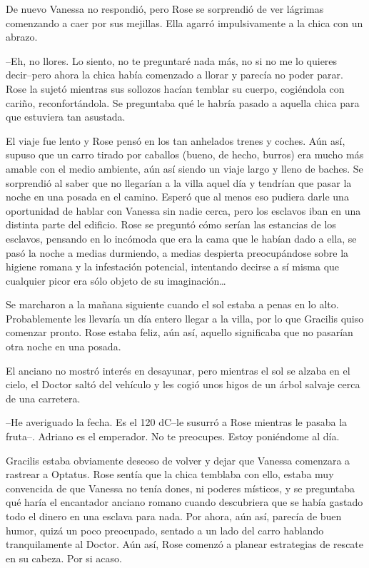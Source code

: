 De nuevo Vanessa no respondió, pero Rose se sorprendió de ver lágrimas
comenzando a caer por sus mejillas. Ella agarró impulsivamente a la
chica con un abrazo.

--Eh, no llores. Lo siento, no te preguntaré nada más, no si no me lo
quieres decir--pero ahora la chica había comenzado a llorar y parecía no
poder parar. Rose la sujetó mientras sus sollozos hacían temblar su
cuerpo, cogiéndola con cariño, reconfortándola. Se preguntaba qué le
habría pasado a aquella chica para que estuviera tan asustada.

El viaje fue lento y Rose pensó en los tan anhelados trenes y coches.
Aún así, supuso que un carro tirado por caballos (bueno, de hecho,
burros) era mucho más amable con el medio ambiente, aún así siendo un
viaje largo y lleno de baches. Se sorprendió al saber que no llegarían a
la villa aquel día y tendrían que pasar la noche en una posada en el
camino. Esperó que al menos eso pudiera darle una oportunidad de hablar
con Vanessa sin nadie cerca, pero los esclavos iban en una distinta
parte del edificio. Rose se preguntó cómo serían las estancias de los
esclavos, pensando en lo incómoda que era la cama que le habían dado a
ella, se pasó la noche a medias durmiendo, a medias despierta
preocupándose sobre la higiene romana y la infestación potencial,
intentando decirse a sí misma que cualquier picor era sólo objeto de su
imaginación\ldots{}

Se marcharon a la mañana siguiente cuando el sol estaba a penas en lo
alto. Probablemente les llevaría un día entero llegar a la villa, por lo
que Gracilis quiso comenzar pronto. Rose estaba feliz, aún así, aquello
significaba que no pasarían otra noche en una posada.

El anciano no mostró interés en desayunar, pero mientras el sol se
alzaba en el cielo, el Doctor saltó del vehículo y les cogió unos higos
de un árbol salvaje cerca de una carretera.

--He averiguado la fecha. Es el 120 dC--le susurró a Rose mientras le
pasaba la fruta--. Adriano es el emperador. No te preocupes. Estoy
poniéndome al día.

Gracilis estaba obviamente deseoso de volver y dejar que Vanessa
comenzara a rastrear a Optatus. Rose sentía que la chica temblaba con
ello, estaba muy convencida de que Vanessa no tenía dones, ni poderes
místicos, y se preguntaba qué haría el encantador anciano romano cuando
descubriera que se había gastado todo el dinero en una esclava para
nada. Por ahora, aún así, parecía de buen humor, quizá un poco
preocupado, sentado a un lado del carro hablando tranquilamente al
Doctor. Aún así, Rose comenzó a planear estrategias de rescate en su
cabeza. Por si acaso.

